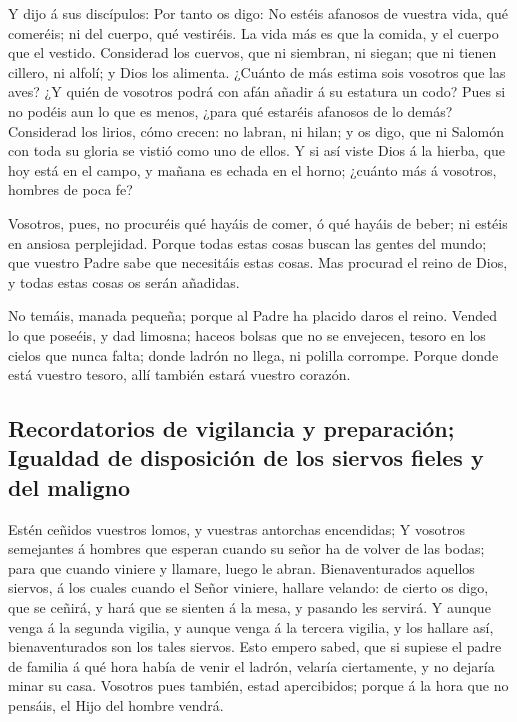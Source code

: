  Y dijo á sus discípulos: Por tanto os digo: No estéis
afanosos de vuestra vida, qué comeréis; ni del cuerpo, qué vestiréis.
 La vida más es que la comida, y el cuerpo que el
vestido.  Considerad los cuervos, que ni siembran, ni
siegan; que ni tienen cillero, ni alfolí; y Dios los alimenta. ¿Cuánto
de más estima sois vosotros que las aves?  ¿Y quién de
vosotros podrá con afán añadir á su estatura un codo? 
Pues si no podéis aun lo que es menos, ¿para qué estaréis afanosos de lo
demás?  Considerad los lirios, cómo crecen: no labran, ni
hilan; y os digo, que ni Salomón con toda su gloria se vistió como uno
de ellos.  Y si así viste Dios á la hierba, que hoy está
en el campo, y mañana es echada en el horno; ¿cuánto más á vosotros,
hombres de poca fe?

 Vosotros, pues, no procuréis qué hayáis de comer, ó qué
hayáis de beber; ni estéis en ansiosa perplejidad. 
Porque todas estas cosas buscan las gentes del mundo; que vuestro Padre
sabe que necesitáis estas cosas.  Mas procurad el reino
de Dios, y todas estas cosas os serán añadidas.

 No temáis, manada pequeña; porque al Padre ha placido
daros el reino.  Vended lo que poseéis, y dad limosna;
haceos bolsas que no se envejecen, tesoro en los cielos que nunca falta;
donde ladrón no llega, ni polilla corrompe.  Porque donde
está vuestro tesoro, allí también estará vuestro corazón.

\hypertarget{recordatorios-de-vigilancia-y-preparaciuxf3n-igualdad-de-disposiciuxf3n-de-los-siervos-fieles-y-del-maligno}{%
\subsection{Recordatorios de vigilancia y preparación; Igualdad de
disposición de los siervos fieles y del
maligno}\label{recordatorios-de-vigilancia-y-preparaciuxf3n-igualdad-de-disposiciuxf3n-de-los-siervos-fieles-y-del-maligno}}

 Estén ceñidos vuestros lomos, y vuestras antorchas
encendidas;  Y vosotros semejantes á hombres que esperan
cuando su señor ha de volver de las bodas; para que cuando viniere y
llamare, luego le abran.  Bienaventurados aquellos
siervos, á los cuales cuando el Señor viniere, hallare velando: de
cierto os digo, que se ceñirá, y hará que se sienten á la mesa, y
pasando les servirá.  Y aunque venga á la segunda
vigilia, y aunque venga á la tercera vigilia, y los hallare así,
bienaventurados son los tales siervos.  Esto empero
sabed, que si supiese el padre de familia á qué hora había de venir el
ladrón, velaría ciertamente, y no dejaría minar su casa. 
Vosotros pues también, estad apercibidos; porque á la hora que no
pensáis, el Hijo del hombre vendrá.

